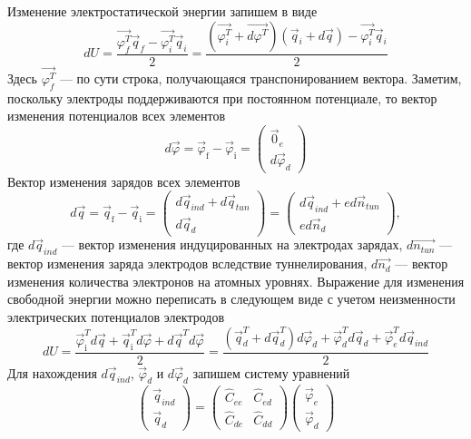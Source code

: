 \documentclass[12pt,a4paper]{report}
\begin{document}
Изменение электростатической энергии запишем в виде
\begin{equation}
  dU = 
  \frac{\vec{\varphi_{f}^T}\vec{q}_{f}-\vec{\varphi_{i}^T}\vec{q}_{i}}{2}=
  \frac{(\vec{\varphi_{i}^T}+\vec{d\varphi^T})
  (\vec{q}_{i}+d\vec{q})
  -\vec{\varphi_{i}^T}\vec{q}_{i}}{2}
\end{equation}
Здесь $\vec{\varphi_{f}^T}$ — по сути строка, получающаяся транспонированием вектора. Заметим, поскольку электроды поддерживаются при постоянном потенциале, то 
вектор изменения потенциалов всех элементов 
\begin{equation}
  d\vec{\varphi}=
  \vec{\varphi}_{\mbox{f}}-\vec{\varphi}_{\mbox{i}}=
  \left(
  \begin{array}{c}
   \vec 0_e\\
   d\vec \varphi_d
  \end{array}
  \right)
\end{equation}
Вектор изменения зарядов всех элементов 
\begin{equation}
  d\vec{q}=
  \vec{q}_{\mbox{f}}-\vec{q}_{\mbox{i}}=
  \left(
  \begin{array}{c}
   d\vec q_{ind}+d\vec q_{tun}\\
   d\vec q_d
  \end{array}
  \right)=
  \left(
  \begin{array}{c}
   d\vec q_{ind}+ed\vec n_{tun}\\
   ed\vec n_d
  \end{array}
  \right),
\end{equation}
где $d\vec q_{ind}$ — вектор изменения индуцированных на электродах зарядах, $d\vec{n_{tun}}$ — вектор изменения заряда электродов вследствие туннелирования, $d\vec{n_d}$ — вектор изменения количества электронов на атомных уровнях.
Выражение для изменения свободной энергии можно переписать в следующем 
виде с учетом неизменности электрических потенциалов электродов
\begin{equation}
  dU = \frac{\vec{\varphi}^T_{\mbox{i}}d\vec{q}+
  \vec{q}^T_{\mbox{i}}d\vec{\varphi}+
  d\vec{q}^Td\vec{\varphi}}{2}=
  \frac{(\vec{q}^T_d+d\vec{q}^T_d)d\vec{\varphi}_d+
  \vec{\varphi}_d^Td\vec{q}_d+
  \vec{\varphi}_e^Td\vec{q}_{ind}}{2}
\end{equation}
Для нахождения $d\vec q_{ind}$, $\vec{\varphi}_d$ и 
$d\vec{\varphi}_d$ запишем систему уравнений
\begin{equation}\label{eq3}
  \left(
  \begin{array}{c}
   \vec q_{ind}\\
   \vec q_d
  \end{array}
  \right)=
  \left(
  \begin{array}{cc}
   \hat C_{ee} & \hat C_{ed}\\
   \hat C_{de} & \hat C_{dd}
  \end{array}
  \right)
  \left(
  \begin{array}{c}
   \vec \varphi_e\\
   \vec \varphi_d
  \end{array}
  \right)
\end{equation}
\end{document}
